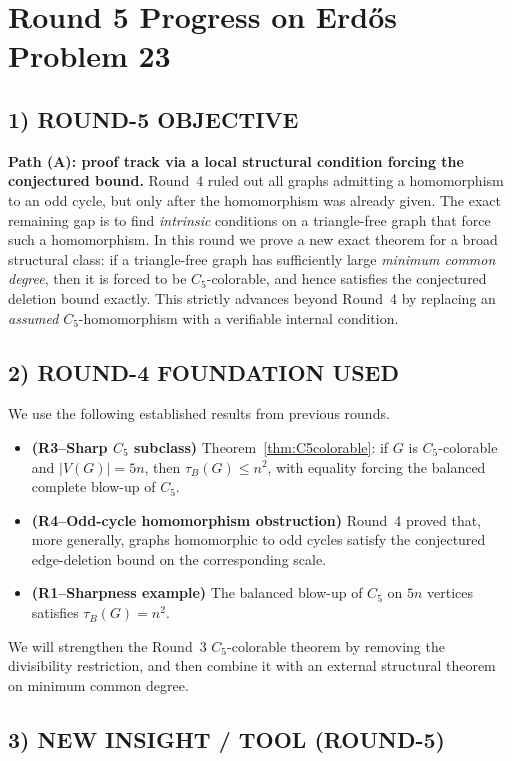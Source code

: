 \section{Round 5 Progress on Erd\H{o}s Problem 23}

\subsection*{1) ROUND-5 OBJECTIVE}
\textbf{Path (A): proof track via a local structural condition forcing the conjectured bound.}
Round~4 ruled out all graphs admitting a homomorphism to an odd cycle, but only after the
homomorphism was already given.  The exact remaining gap is to find \emph{intrinsic} conditions on a
triangle-free graph that force such a homomorphism.
In this round we prove a new exact theorem for a broad structural class:
if a triangle-free graph has sufficiently large \emph{minimum common degree}, then it is forced to be
$C_5$-colorable, and hence satisfies the conjectured deletion bound exactly.
This strictly advances beyond Round~4 by replacing an \emph{assumed} $C_5$-homomorphism with a
verifiable internal condition.

\subsection*{2) ROUND-4 FOUNDATION USED}
We use the following established results from previous rounds.
\begin{itemize}
\item \textbf{(R3--Sharp $C_5$ subclass)} Theorem~\ref{thm:C5colorable}: if $G$ is $C_5$-colorable and
      $|V(G)|=5n$, then $\tau_B(G)\le n^2$, with equality forcing the balanced complete blow-up of $C_5$.
\item \textbf{(R4--Odd-cycle homomorphism obstruction)} Round~4 proved that, more generally, graphs
      homomorphic to odd cycles satisfy the conjectured edge-deletion bound on the corresponding scale.
\item \textbf{(R1--Sharpness example)} The balanced blow-up of $C_5$ on $5n$ vertices satisfies
      $\tau_B(G)=n^2$.
\end{itemize}
We will strengthen the Round~3 $C_5$-colorable theorem by removing the divisibility restriction,
and then combine it with an external structural theorem on minimum common degree.

\subsection*{3) NEW INSIGHT / TOOL (ROUND-5)}
